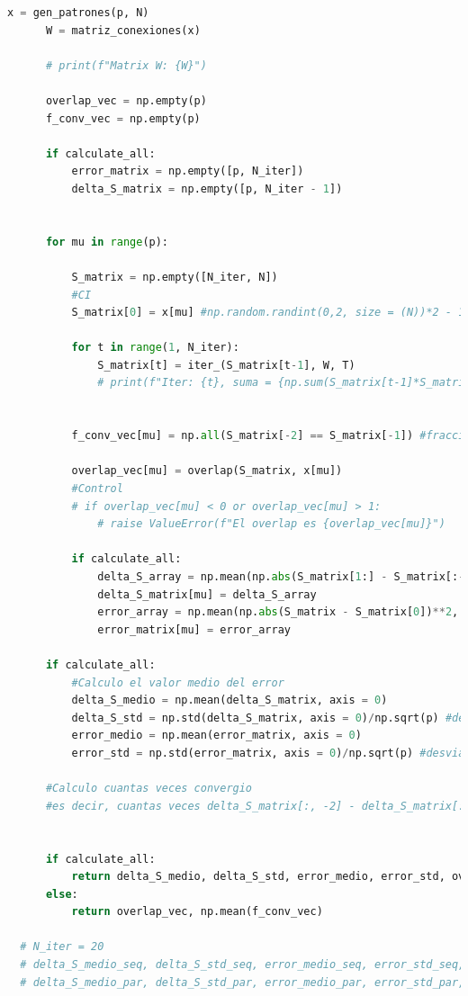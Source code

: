 \documentclass[aps,prb,twocolumn,superscriptaddress,floatfix,longbibliography]{revtex4-2}
\begin{document}
\begin{lstlisting}[language=Python]
      x = gen_patrones(p, N)
      W = matriz_conexiones(x)
  
      # print(f"Matrix W: {W}")
  
      overlap_vec = np.empty(p)
      f_conv_vec = np.empty(p)
  
      if calculate_all:
          error_matrix = np.empty([p, N_iter])
          delta_S_matrix = np.empty([p, N_iter - 1])
          
  
      for mu in range(p):
  
          S_matrix = np.empty([N_iter, N])
          #CI
          S_matrix[0] = x[mu] #np.random.randint(0,2, size = (N))*2 - 1
  
          for t in range(1, N_iter):
              S_matrix[t] = iter_(S_matrix[t-1], W, T)
              # print(f"Iter: {t}, suma = {np.sum(S_matrix[t-1]*S_matrix[t])}")
          
  
          f_conv_vec[mu] = np.all(S_matrix[-2] == S_matrix[-1]) #fraccion de simulaciones que convergieron
          
          overlap_vec[mu] = overlap(S_matrix, x[mu])
          #Control
          # if overlap_vec[mu] < 0 or overlap_vec[mu] > 1:
              # raise ValueError(f"El overlap es {overlap_vec[mu]}")
  
          if calculate_all:
              delta_S_array = np.mean(np.abs(S_matrix[1:] - S_matrix[:-1]), axis = 1)
              delta_S_matrix[mu] = delta_S_array
              error_array = np.mean(np.abs(S_matrix - S_matrix[0])**2, axis = 1)
              error_matrix[mu] = error_array
  
      if calculate_all:
          #Calculo el valor medio del error
          delta_S_medio = np.mean(delta_S_matrix, axis = 0)
          delta_S_std = np.std(delta_S_matrix, axis = 0)/np.sqrt(p) #desviacion estandard de la media
          error_medio = np.mean(error_matrix, axis = 0)
          error_std = np.std(error_matrix, axis = 0)/np.sqrt(p) #desviacion estandard de la media
  
      #Calculo cuantas veces convergio
      #es decir, cuantas veces delta_S_matrix[:, -2] - delta_S_matrix[:,-1] == 0
  
  
      if calculate_all:
          return delta_S_medio, delta_S_std, error_medio, error_std, overlap_vec, f_conv_vec
      else:
          return overlap_vec, np.mean(f_conv_vec)
  
  # N_iter = 20
  # delta_S_medio_seq, delta_S_std_seq, error_medio_seq, error_std_seq, overlap_vec_seq, f_conv_seq = evolution(p, N, iter_secuencial_determinista, overlap_determinista, N_iter = N_iter, calculate_all=True)
  # delta_S_medio_par, delta_S_std_par, error_medio_par, error_std_par, overlap_vec_par, f_conv_par = evolution(p, N, iter_secuencial_determinista, overlap_determinista, N_iter = N_iter, calculate_all=True)
  

\end{lstlisting}
\end{document}

